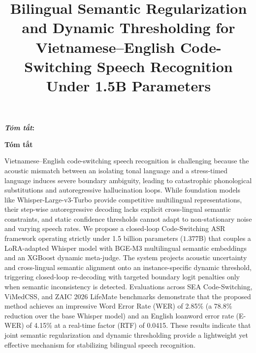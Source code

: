 \documentclass[9pt, conference, a4paper, compsocconf]{IEEEtran}
\makeatletter
\renewenvironment{abstract}
  {\normalfont
   \@IEEEabskeysecsize
   \setlength{\parindent}{0pt}
   \noindent
   \if@twocolumn
     \bfseries\textit{\abstractname}: 
   \else
     \begin{center}\textbf{\abstractname}\end{center}
   \fi}
  {\par}
\renewcommand{\abstractname}{Tóm tắt}
\makeatother
\begin{document}
\fontsize{9}{10}
\selectfont


\title{Bilingual Semantic Regularization and Dynamic Thresholding for Vietnamese–English Code-Switching Speech Recognition Under 1.5B Parameters}

\author{
}

\maketitle

\begin{abstract}
Vietnamese--English code-switching speech recognition is challenging because the acoustic mismatch between an isolating tonal language and a stress-timed language induces severe boundary ambiguity, leading to catastrophic phonological substitutions and autoregressive hallucination loops. While foundation models like Whisper-Large-v3-Turbo provide competitive multilingual representations, their step-wise autoregressive decoding lacks explicit cross-lingual semantic constraints, and static confidence thresholds cannot adapt to non-stationary noise and varying speech rates. We propose a closed-loop Code-Switching ASR framework operating strictly under 1.5 billion parameters ($1.377$B) that couples a LoRA-adapted Whisper model with BGE-M3 multilingual semantic embeddings and an XGBoost dynamic meta-judge. The system projects acoustic uncertainty and cross-lingual semantic alignment onto an instance-specific dynamic threshold, triggering closed-loop re-decoding with targeted boundary logit penalties only when semantic inconsistency is detected. Evaluations across SEA Code-Switching, ViMedCSS, and ZAIC 2026 LifeMate benchmarks demonstrate that the proposed method achieves an impressive Word Error Rate (WER) of 2.85\% (a 78.8\% reduction over the base Whisper model) and an English loanword error rate (E-WER) of 4.15\% at a real-time factor (RTF) of 0.0415. These results indicate that joint semantic regularization and dynamic thresholding provide a lightweight yet effective mechanism for stabilizing bilingual speech recognition.
\end{abstract}
\end{document}
